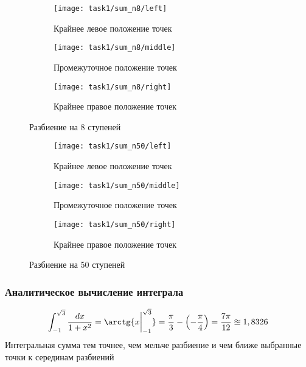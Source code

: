 \begin{figure}[H]
	\centering
	\begin{subfigure}{0.3\textwidth}
		\centering
		\texttt{[image: task1/sum\_n8/left]}\quad
		\caption*{Крайнее левое положение точек}
	\end{subfigure}
	\begin{subfigure}{0.3\textwidth}
		\centering
		\texttt{[image: task1/sum\_n8/middle]}\quad
		\caption*{Промежуточное положение точек}
	\end{subfigure}
	\begin{subfigure}{0.3\textwidth}
		\centering
		\texttt{[image: task1/sum\_n8/right]}\quad
		\caption*{Крайнее правое положение точек}
	\end{subfigure}
	\caption{Разбиение на 8 ступеней}
\end{figure}

\begin{figure}[H]
	\centering
	\begin{subfigure}{0.3\textwidth}
		\centering
		\texttt{[image: task1/sum\_n50/left]}\quad
		\caption*{Крайнее левое положение точек}
	\end{subfigure}
	\begin{subfigure}{0.3\textwidth}
		\centering
		\texttt{[image: task1/sum\_n50/middle]}\quad
		\caption*{Промежуточное положение точек}
	\end{subfigure}
	\begin{subfigure}{0.3\textwidth}
		\centering
		\texttt{[image: task1/sum\_n50/right]}\quad
		\caption*{Крайнее правое положение точек}
	\end{subfigure}
	\caption{Разбиение на 50 ступеней}
\end{figure}
\subsubsection*{Аналитическое вычисление интеграла}
\begin{equation*}
	\int_{-1}^{\sqrt{3}}\frac{dx}{1+x^2}=\arctg{x\bigg|_{-1}^{\sqrt{3}}}=\frac{\pi }{3}-\left(-\frac{\pi }{4}\right)=\frac{7\pi}{12}\approxeq1,8326
\end{equation*}
Интегральная сумма тем точнее, чем мельче разбиение и чем ближе выбранные точки к серединам разбиений
